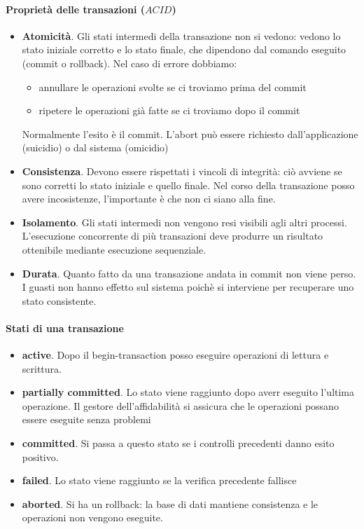 \paragraph{Proprietà delle transazioni ($ACID$)}
\begin{itemize}
	\item \textbf{Atomicità}. Gli stati intermedi della transazione non si vedono: vedono lo stato iniziale corretto e lo stato finale, che dipendono dal comando eseguito (commit o rollback). Nel caso di errore dobbiamo:
	\begin{itemize}
		\item annullare le operazioni svolte se ci troviamo prima del commit
		\item ripetere le operazioni già fatte se ci troviamo dopo il commit
	\end{itemize}
	Normalmente l'esito è il commit. L'abort può essere richiesto dall'applicazione (suicidio) o dal sistema (omicidio)
	\item \textbf{Consistenza}. Devono essere rispettati i vincoli di integrità: ciò avviene se sono corretti lo stato iniziale e quello finale. Nel corso della transazione posso avere incosistenze, l'importante è che non ci siano alla fine.
	\item \textbf{Isolamento}. Gli stati intermedi non vengono resi visibili agli altri processi. L'esecuzione concorrente di più transazioni deve produrre un risultato ottenibile mediante esecuzione sequenziale.
	\item \textbf{Durata}. Quanto fatto da una transazione andata in commit non viene perso. I guasti non hanno effetto sul sistema poichè si interviene per recuperare uno stato consistente.
\end{itemize}

\paragraph{Stati di una transazione}
\begin{itemize}
	\item \textbf{active}. Dopo il begin-transaction posso eseguire operazioni di lettura e scrittura.
	\item \textbf{partially committed}. Lo stato viene raggiunto dopo averr eseguito l'ultima operazione. Il gestore dell'affidabilità si assicura che le operazioni possano essere eseguite senza problemi
	\item \textbf{committed}. Si passa a questo stato se i controlli precedenti danno esito positivo.
	\item \textbf{failed}. Lo stato viene raggiunto se la verifica precedente fallisce
	\item \textbf{aborted}. Si ha un rollback: la base di dati mantiene consistenza e le operazioni non vengono eseguite.
\end{itemize}
